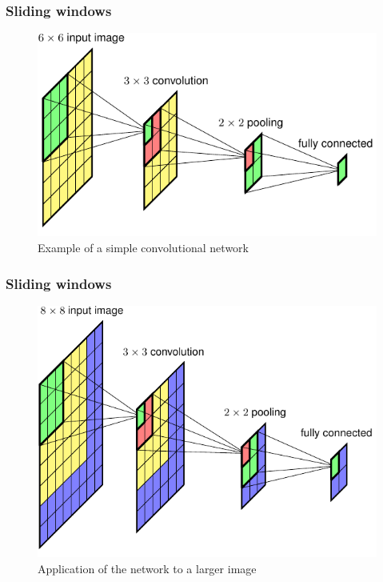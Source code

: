 \documentclass{beamer}
\begin{document}
\begin{frame}
    \frametitle{Sliding windows}
    \begin{figure}
        \caption{Example of a simple convolutional network}
        \includegraphics[height=0.7\textheight]{Figure_22.pdf}
    \end{figure}
\end{frame}

\begin{frame}
    \frametitle{Sliding windows}
    \begin{figure}
        \caption{Application of the network to a larger image}
        \includegraphics[height=0.7\textheight]{Figure_23.pdf}
    \end{figure}
\end{frame}
\end{document}

